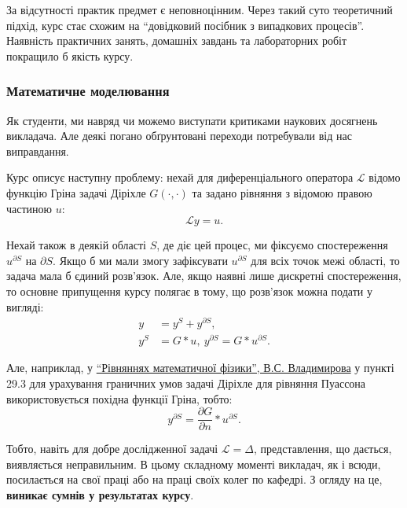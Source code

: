 \documentclass[14pt, a4paper]{extarticle}  %
\begin{document}
За відсутності практик предмет є неповноцінним. Через такий суто теоретичний підхід, курс стає схожим на ``довідковий посібник з випадкових процесів''. Наявність практичних занять, домашніх завдань та лабораторних робіт покращило б якість курсу. 

\subsubsection{Математичне моделювання}
Як студенти, ми навряд чи можемо виступати критиками наукових досягнень викладача. Але деякі погано обґрунтовані переходи потребували від нас виправдання. 

Курс описує наступну проблему: нехай для диференціального оператора $\mathcal{L}$ відомо функцію Гріна задачі Діріхле $G(\cdot, \cdot)$ та задано рівняння з відомою правою частиною $u$:
\[ \mathcal{L} y = u. \]

Нехай також в деякій області $S$, де діє цей процес, ми фіксуємо спостереження $u^{\partial S}$ на $\partial S$. Якщо б ми мали змогу зафіксувати $u^{\partial S}$ для всіх точок межі області, то задача мала б єдиний розв'язок. Але, якщо наявні лише дискретні спостереження, то основне припущення курсу полягає в тому, що розв'язок можна подати у вигляді:
\begin{align*}
   y &= y^S + y^{\partial S}, \\
   y^S &= G * u, \ y^{\partial S} = G * u^{\partial S}.
\end{align*}

Але, наприклад, у \href{http://cmcstuff.esyr.org/vmkbotva-r15/4\%20\%D0\%BA\%D1\%83\%D1\%80\%D1\%81/8\%20\%D0\%A1\%D0\%B5\%D0\%BC\%D0\%B5\%D1\%81\%D1\%82\%D1\%80/PDE\%20Extra\%20Chapters\%20\%5BHapaev\%20M.M.\%5D/\%D0\%92.\%D0\%A1.\%20\%D0\%92\%D0\%BB\%D0\%B0\%D0\%B4\%D0\%B8\%D0\%BC\%D0\%B8\%D1\%80\%D0\%BE\%D0\%B2.\%20\%D0\%A3\%D1\%80\%D0\%B0\%D0\%B2\%D0\%BD\%D0\%B5\%D0\%BD\%D0\%B8\%D1\%8F\%20\%D0\%BC\%D0\%B0\%D1\%82\%D0\%B5\%D0\%BC\%D0\%B0\%D1\%82\%D0\%B8\%D1\%87\%D0\%B5\%D1\%81\%D0\%BA\%D0\%BE\%D0\%B9\%20\%D1\%84\%D0\%B8\%D0\%B7\%D0\%B8\%D0\%BA\%D0\%B8.pdf}{``Рівняннях математичної фізики'', В.С. Владимирова} у пункті 29.3 для урахування граничних умов задачі Діріхле для рівняння Пуассона використовується похідна функції Гріна, тобто:
\[ y^{\partial S} = \frac{\partial G}{\partial n} * u^{\partial S}. \]

Тобто, навіть для добре дослідженної задачі $\mathcal{L} = \Delta$, представлення, що дається, виявляється неправильним. В цьому складному моменті викладач, як і всюди, посилається на свої праці або на праці своїх колег по кафедрі. З огляду на це, \textbf{виникає сумнів у результатах курсу}. \medskip
\end{document}
